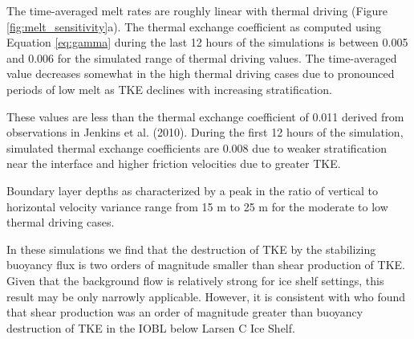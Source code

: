 \documentclass[draft]{styles/agujournal2019}
\begin{document}
The time-averaged melt rates are roughly linear with thermal driving (Figure \ref{fig:melt_sensitivity}a). The thermal exchange coefficient as computed using Equation \ref{eq:gamma} during the last 12 hours of the simulations is between 0.005 and 0.006 for the simulated range of thermal driving values. The time-averaged value decreases somewhat in the high thermal driving cases due to pronounced periods of low melt as TKE declines with increasing stratification. 

These values are less than the thermal exchange coefficient of 0.011 derived from observations in Jenkins et al. (2010). During the first 12 hours of the simulation, simulated thermal exchange coefficients are 0.008 due to weaker stratification near the interface and higher friction velocities due to greater TKE. 

Boundary layer depths as characterized by a peak in the ratio of vertical to horizontal velocity variance range from 15 m to 25 m for the moderate to low thermal driving cases.

In these simulations we find that the destruction of TKE by the stabilizing buoyancy flux is two orders of magnitude smaller than shear production of TKE. Given that the background flow is relatively strong for ice shelf settings, this result may be only narrowly applicable. However, it is consistent with \citep{davis_nicholls} who found that shear production was an order of magnitude greater than buoyancy destruction of TKE in the IOBL below Larsen C Ice Shelf. 



\end{document}
